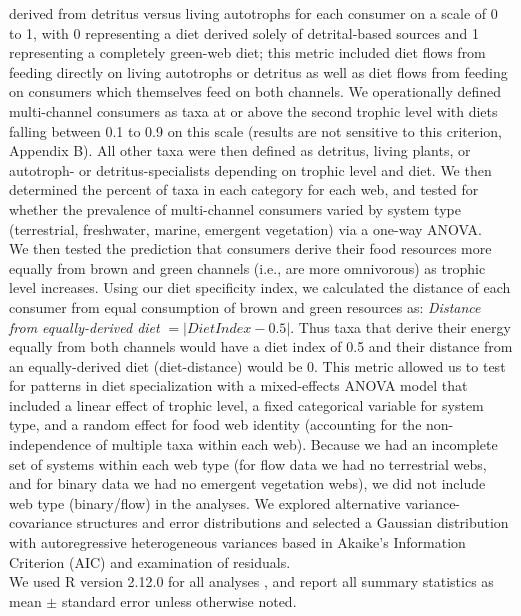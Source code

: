 \documentclass[12pt,a4paper,oneside]{article}
\begin{document}
derived from detritus versus living autotrophs for each consumer on a scale
of 0 to 1, with 0 representing a diet derived solely of detrital-based
sources and 1 representing a completely green-web diet; this metric
included diet flows from feeding directly on living
autotrophs or detritus as well as diet flows from feeding on consumers
which themselves feed on both channels. We
operationally defined multi-channel consumers as taxa at or above the
second trophic level with diets falling between 0.1 to 0.9 on this
scale (results are not sensitive to this criterion, Appendix B). All
other taxa were then defined as detritus, living plants, or 
autotroph- or detritus-specialists depending on trophic level and
diet. We then determined the percent of taxa in each category for each
web, and tested for whether the prevalence of multi-channel consumers
varied by system type (terrestrial, freshwater, marine, emergent
vegetation) via a one-way ANOVA.
\\
\indent We then tested the prediction that consumers derive their food resources more
equally from brown and green channels
(i.e., are more omnivorous) as trophic level
increases. Using our diet specificity index, we
calculated the distance of 
each consumer from equal consumption of brown and green resources as:
\emph{Distance from equally-derived diet} \(= |Diet Index-0.5|\). Thus taxa
that derive their energy equally from both channels would have
a diet index of 0.5 and their distance from an equally-derived diet
(diet-distance) would be 0. This metric allowed us to test for
patterns in diet specialization
with a mixed-effects ANOVA model that included a linear effect of
trophic level, a fixed categorical variable for system type, 
and a random effect for food web identity (accounting for the non-independence of multiple taxa within each web). Because we had an
incomplete set of systems within each
web type (for flow data we had no terrestrial webs, and for binary data
we had no emergent vegetation webs), we did not include web type
(binary/flow) in the analyses. We explored alternative
variance-covariance structures and error distributions
\citep{Bolker:2009, Wolfinger:1996} 
and selected a Gaussian distribution with
autoregressive heterogeneous variances based in
Akaike's Information Criterion (AIC) and examination
of residuals. 
\\ 
\indent We used R version 2.12.0 for all
analyses \citep{Rcore:2010}, and report all summary statistics as mean ${\pm}$
standard error unless otherwise noted.
\\
\\
\end{document}
